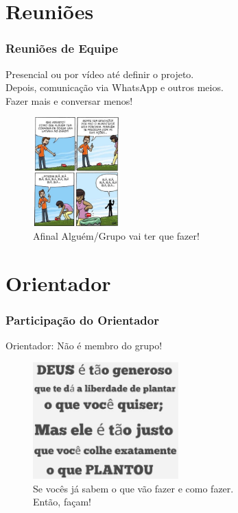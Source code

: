 \documentclass{beamer}
\begin{document}
\section{Reuniões}
\begin{frame}
  \frametitle{Reuniões de Equipe}
  \begin{block}{}
    Presencial ou por vídeo até definir o projeto.\\
    Depois, comunicação via WhatsApp e outros meios.\\
    Fazer mais e conversar menos!
    \begin{figure}
      \centering
      \includegraphics[width=0.3\textwidth]{reunioes.jpg} %
      \captionsetup{labelformat=simple, labelsep=period}
      \caption{Afinal Alguém/Grupo vai ter que fazer!}
    \end{figure}
  \end{block}
\end{frame}

\section{Orientador}
\begin{frame}
  \frametitle{Participação do Orientador}
  \begin{block}{Orientador: Não é membro do grupo!}
    \begin{figure}
      \centering
      \includegraphics[width=0.5\textwidth]{arbitrio.jpg} %
      \captionsetup{labelformat=simple, labelsep=period}
      \caption{Se vocês já sabem o que vão fazer e como fazer.\\
      Então, façam!}
    \end{figure}
  \end{block}
\end{frame}
\end{document}

